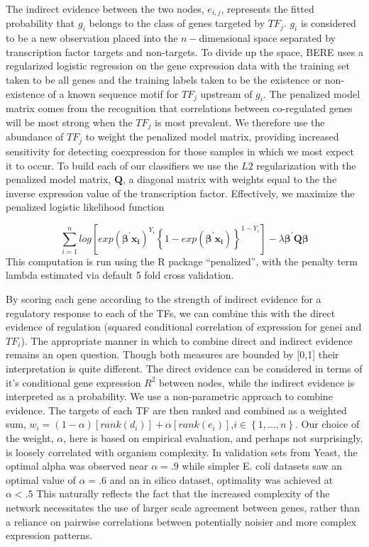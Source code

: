\documentclass[english]{article}
\begin{document}
The indirect evidence between the two nodes, $e_{i,j}$, represents
the fitted probability that $g_{i}$ belongs to the class of genes
targeted by $TF_{j}$. $g_{i}$ is considered to be a new observation
placed into the $n-$dimensional space separated by transcription
factor targets and non-targets. To divide up the space, BERE uses
a regularized logistic regression on the gene expression data with
the training set taken to be all genes and the training labels taken
to be the existence or non-existence of a known sequence motif for
$TF_{j}$ upstream of $g_{i}$. The penalized model matrix comes from
the recognition that correlations between co-regulated genes will
be most strong when the $TF_{j}$ is most prevalent. We therefore
use the abundance of $TF_{j}$ to weight the penalized model matrix,
providing increased sensitivity for detecting coexpression for those
samples in which we most expect it to occur. To build each of our
classifiers we use the $L2$ regularization with the penalized model
matrix, $\mathbf{Q}$, a diagonal matrix with weights equal to the
the inverse expression value of the transcription factor. Effectively,
we maximize the penalized logistic likelihood function 

\[
\sum_{i=1}^{n}log\left[exp\left(\mathbf{\beta^{\prime}x_{i}}\right)^{Y_{i}}\left\{ 1-exp\left(\mathbf{\beta^{\prime}x_{i}}\right)\right\} ^{1-Y_{i}}\right]-\lambda\mathbf{\beta^{\prime}Q\beta}
\]
This computation is run using the R package “penalized”, with the
penalty term lambda estimated via default 5 fold cross validation.

By scoring each gene according to the strength of indirect evidence
for a regulatory response to each of the TFs, we can combine this
with the direct evidence of regulation (squared conditional correlation
of expression for genei and $TF_{i}$). The appropriate manner in
which to combine direct and indirect evidence remains an open question.
Though both measures are bounded by {[}0,1{]} their interpretation
is quite different. The direct evidence can be considered in terms
of it's conditional gene expression $R^{2}$ between nodes, while
the indirect evidence is interpreted as a probability. We use a non-parametric
approach to combine evidence. The targets of each TF are then ranked
and combined as a weighted sum, $w_{i}=\left(1-\alpha\right)\left[rank\left(d_{i}\right)\right]+\alpha\left[rank\left(e_{i}\right)\right]$,$i\in\left\{ 1,\dots,n\right\} $.
Our choice of the weight, $\alpha$, here is based on empirical evaluation,
and perhaps not surprisingly, is loosely correlated with organism
complexity. In validation sets from Yeast, the optimal alpha was observed
near $\alpha=.9$ while simpler E. coli datasets saw an optimal value
of $\alpha=.6$ and an in silico dataset, optimality was achieved
at $\alpha<.5$ This naturally reflects the fact that the increased
complexity of the network necessitates the use of larger scale agreement
between genes, rather than a reliance on pairwise correlations between
potentially noisier and more complex expression patterns. 
\end{document}
